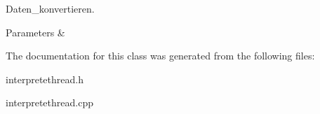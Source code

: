 Daten\+\_\+konvertieren. 


\begin{DoxyParams}{Parameters}
{\em } & \\
\hline
\end{DoxyParams}


The documentation for this class was generated from the following files\+:\begin{DoxyCompactItemize}
\item 
interpretethread.\+h\item 
interpretethread.\+cpp\end{DoxyCompactItemize}
